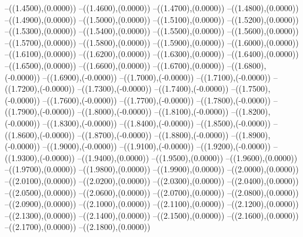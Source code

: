 {	--({\sx*(1.4500)},{\sy*(0.0000)})
	--({\sx*(1.4600)},{\sy*(0.0000)})
	--({\sx*(1.4700)},{\sy*(0.0000)})
	--({\sx*(1.4800)},{\sy*(0.0000)})
	--({\sx*(1.4900)},{\sy*(0.0000)})
	--({\sx*(1.5000)},{\sy*(0.0000)})
	--({\sx*(1.5100)},{\sy*(0.0000)})
	--({\sx*(1.5200)},{\sy*(0.0000)})
	--({\sx*(1.5300)},{\sy*(0.0000)})
	--({\sx*(1.5400)},{\sy*(0.0000)})
	--({\sx*(1.5500)},{\sy*(0.0000)})
	--({\sx*(1.5600)},{\sy*(0.0000)})
	--({\sx*(1.5700)},{\sy*(0.0000)})
	--({\sx*(1.5800)},{\sy*(0.0000)})
	--({\sx*(1.5900)},{\sy*(0.0000)})
	--({\sx*(1.6000)},{\sy*(0.0000)})
	--({\sx*(1.6100)},{\sy*(0.0000)})
	--({\sx*(1.6200)},{\sy*(0.0000)})
	--({\sx*(1.6300)},{\sy*(0.0000)})
	--({\sx*(1.6400)},{\sy*(0.0000)})
	--({\sx*(1.6500)},{\sy*(0.0000)})
	--({\sx*(1.6600)},{\sy*(0.0000)})
	--({\sx*(1.6700)},{\sy*(0.0000)})
	--({\sx*(1.6800)},{\sy*(-0.0000)})
	--({\sx*(1.6900)},{\sy*(-0.0000)})
	--({\sx*(1.7000)},{\sy*(-0.0000)})
	--({\sx*(1.7100)},{\sy*(-0.0000)})
	--({\sx*(1.7200)},{\sy*(-0.0000)})
	--({\sx*(1.7300)},{\sy*(-0.0000)})
	--({\sx*(1.7400)},{\sy*(-0.0000)})
	--({\sx*(1.7500)},{\sy*(-0.0000)})
	--({\sx*(1.7600)},{\sy*(-0.0000)})
	--({\sx*(1.7700)},{\sy*(-0.0000)})
	--({\sx*(1.7800)},{\sy*(-0.0000)})
	--({\sx*(1.7900)},{\sy*(-0.0000)})
	--({\sx*(1.8000)},{\sy*(-0.0000)})
	--({\sx*(1.8100)},{\sy*(-0.0000)})
	--({\sx*(1.8200)},{\sy*(-0.0000)})
	--({\sx*(1.8300)},{\sy*(-0.0000)})
	--({\sx*(1.8400)},{\sy*(-0.0000)})
	--({\sx*(1.8500)},{\sy*(-0.0000)})
	--({\sx*(1.8600)},{\sy*(-0.0000)})
	--({\sx*(1.8700)},{\sy*(-0.0000)})
	--({\sx*(1.8800)},{\sy*(-0.0000)})
	--({\sx*(1.8900)},{\sy*(-0.0000)})
	--({\sx*(1.9000)},{\sy*(-0.0000)})
	--({\sx*(1.9100)},{\sy*(-0.0000)})
	--({\sx*(1.9200)},{\sy*(-0.0000)})
	--({\sx*(1.9300)},{\sy*(-0.0000)})
	--({\sx*(1.9400)},{\sy*(0.0000)})
	--({\sx*(1.9500)},{\sy*(0.0000)})
	--({\sx*(1.9600)},{\sy*(0.0000)})
	--({\sx*(1.9700)},{\sy*(0.0000)})
	--({\sx*(1.9800)},{\sy*(0.0000)})
	--({\sx*(1.9900)},{\sy*(0.0000)})
	--({\sx*(2.0000)},{\sy*(0.0000)})
	--({\sx*(2.0100)},{\sy*(0.0000)})
	--({\sx*(2.0200)},{\sy*(0.0000)})
	--({\sx*(2.0300)},{\sy*(0.0000)})
	--({\sx*(2.0400)},{\sy*(0.0000)})
	--({\sx*(2.0500)},{\sy*(0.0000)})
	--({\sx*(2.0600)},{\sy*(0.0000)})
	--({\sx*(2.0700)},{\sy*(0.0000)})
	--({\sx*(2.0800)},{\sy*(0.0000)})
	--({\sx*(2.0900)},{\sy*(0.0000)})
	--({\sx*(2.1000)},{\sy*(0.0000)})
	--({\sx*(2.1100)},{\sy*(0.0000)})
	--({\sx*(2.1200)},{\sy*(0.0000)})
	--({\sx*(2.1300)},{\sy*(0.0000)})
	--({\sx*(2.1400)},{\sy*(0.0000)})
	--({\sx*(2.1500)},{\sy*(0.0000)})
	--({\sx*(2.1600)},{\sy*(0.0000)})
	--({\sx*(2.1700)},{\sy*(0.0000)})
	--({\sx*(2.1800)},{\sy*(0.0000)})
}
